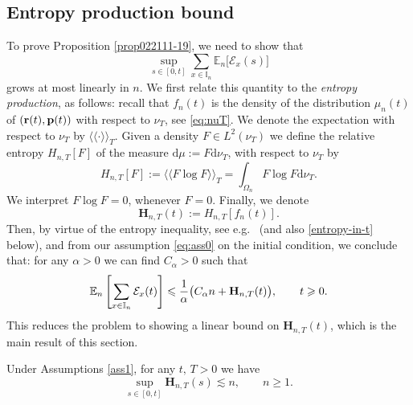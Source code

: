 \documentclass[EJP]{ejpecp} %
\newcommand\al{\alpha}
\newcommand\llangle{\langle\!\langle}
\newcommand\rrangle{\rangle\!\rangle}
\newcommand\E{{\mathbb E}}
\newcommand\T{{\mathbb I}}
\newcommand\Om{\Omega}
\renewcommand{\ge}{\geqslant}
\renewcommand{\le}{\leqslant}
\newcommand{\dd  }{\mathrm{d}}
\numberwithin{equation}{section}
\begin{document}
\subsection{Entropy production bound}

\label{sec7entropy}

To prove Proposition \ref{prop022111-19}, we need to show that
$$
 \sup_{s\in[0,t]}\sum_{x \in \T_n} \E_n\big[ \mathcal{E}_x(s) \big]
$$
 grows at most
linearly in $n$.
We first relate this quantity to the \emph{entropy production}, as
follows: recall that $f_n(t)$ is the density of
the distribution $\mu_n(t)$ of $({\bf r}(t),{\bf p}(t))$ with respect to $\nu_T$, see \eqref{eq:nuT}.
We denote the expectation with respect to $\nu_T$ by  $\llangle \cdot \rrangle_T$.
Given a density $F\in L^2(\nu_T)$ we define the relative entropy
$H_{n,T}[F]$ of
the measure $\dd \mu:=F\dd \nu_T$, with respect to  $\nu_T$ by 
\begin{equation}
\label{rel-ent}
H_{n,T}[F]:= \llangle F\log F \rrangle_T= \int_{\Om_n} F\log F \dd \nu_{T}.
\end{equation}
We interpret $F\log  F=0$, whenever $F=0$. Finally, we denote \begin{equation}
  \label{eq:7a}
\mathbf{H}_{n,T}(t) := H_{n,T}[f_n(t)].
\end{equation}
Then, by virtue of the entropy inequality, see e.g.~
  \cite[p.~338]{KL} (and also \eqref{entropy-in-t} below), and from our assumption \eqref{eq:ass0} on the initial condition, 
we conclude that: for any $\al>0$ we can find $C_\al>0$ such that
\begin{equation}\label{eq:boundent}
 \E_n\left[\sum_{x\in\T_n}{\cal E}_x(t)\right]
  \le \frac{1}{\al}\big(C_\al n+ \mathbf{H}_{n,T}(t)\big),\qquad t\ge0.
 \end{equation}
This reduces the problem to showing a linear bound on $\mathbf{H}_{n,T}(t)$, which is the main result of this section.
\begin{proposition}
\label{cor021211-19}
Under Assumptions \ref{ass1}, 
for any $t,\,T>0$  we have
\begin{equation}
  \label{eq:10bb}
 \sup_{s\in[0,t]} \mathbf{H}_{n,T}(s) \lesssim  n,\qquad n\ge1.
\end{equation}
\end{proposition}
\end{document}
